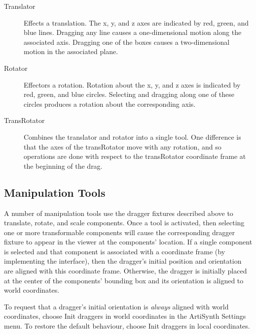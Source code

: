\documentclass{article}
\begin{document}
\begin{description}

\item[Translator]\mbox{}

Effects a translation. The x, y, and z axes are
indicated by red, green, and blue lines. Dragging any line causes
a one-dimensional motion along the associated axis. Dragging one
of the boxes causes a two-dimensional motion in the associated plane.

\item[Rotator]\mbox{}

Effectors a rotation. Rotation about the
x, y, and z axes is indicated by red, green, and blue circles.
Selecting and dragging along one of these circles produces
a rotation about the corresponding axis.

\item[TransRotator]\mbox{}

Combines the translator and rotator into a single tool. One difference
is that the axes of the transRotator move with any rotation,
and so operations are done with respect to the transRotator coordinate frame
at the beginning of the drag.

\end{description}

\subsection{Manipulation Tools}
\label{ManipulationToolsSec}

A number of manipulation tools use the dragger fixtures described
above to translate, rotate, and scale components. Once a tool is
activated, then selecting one or more transformable components will
cause the corresponding dragger fixture to appear in the viewer at the
components' location. If a single component is selected and 
that component is 
associated with a coordinate frame (by implementing the
 interface), then the dragger's initial position
and orientation are aligned with this coordinate frame.
Otherwise, the dragger is initially placed at the center of the
components' bounding box and its orientation is aligned to world
coordinates.

To request that a dragger's initial orientation is {\it always}
aligned with world coordinates, choose {\sf Init draggers in world
coordinates} in the ArtiSynth {\sf Settings} menu. To restore the
default behaviour, choose {\sf Init draggers in local coordinates}.
\end{document}
